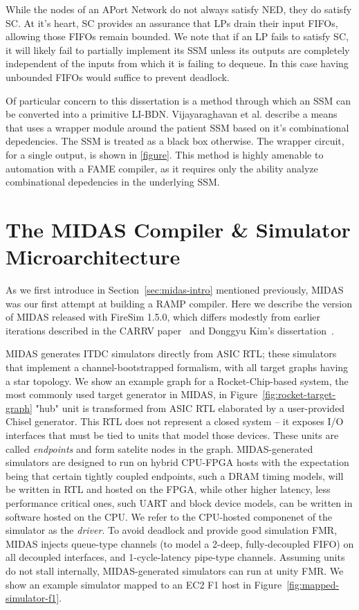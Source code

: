 While the nodes of an APort Network do not always satisfy NED, they do satisfy
SC. At it's heart, SC provides an assurance that LPs drain their input FIFOs,
allowing those FIFOs remain bounded. We note that if an LP fails to satisfy
SC, it will likely fail to partially implement its SSM unless its outputs are
completely independent of the inputs from which it is failing to dequeue. In
this case having unbounded FIFOs would suffice to prevent deadlock.

Of particular concern to this dissertation is a method through which an SSM can
be converted into a primitive LI-BDN.  Vijayaraghavan et al. describe a means that uses
a wrapper module around the patient SSM based on it's combinational
depedencies. The SSM is treated as a black box otherwise. The wrapper circuit,
for a single output, is shown in \ref{figure}. This method is highly amenable
to automation with a FAME compiler, as it requires only the ability analyze
combinational depedencies in the underlying SSM.

\section{The MIDAS Compiler \& Simulator Microarchitecture}

As we first introduce in Section~\ref{sec:midas-intro} mentioned previously,
MIDAS was our first attempt at building a RAMP compiler. Here we describe the
version of MIDAS released with FireSim 1.5.0, which differs modestly from earlier iterations 
described in the CARRV paper~\cite{MIDAS} and Donggyu Kim's dissertation~\cite{DGKDissertation}.

MIDAS generates ITDC simulators directly from ASIC RTL; these simulators that
implement a channel-bootstrapped formalism, with all target graphs having a
star topology. We show an example graph for a Rocket-Chip-based system, the
most commonly used target generator in MIDAS, in Figure~\ref{fig:rocket-target-graph}
"hub" unit is transformed from ASIC RTL elaborated by a user-provided Chisel
generator. This RTL does not represent a
closed system -- it exposes I/O interfaces that must be tied to units that model those
devices. These units are called \emph{endpoints} and form satelite nodes in the graph.
MIDAS-generated simulators are designed to run on hybrid CPU-FPGA hosts
with the expectation being that certain tightly coupled endpoints, such a DRAM
timing models, will be written in RTL and hosted on the FPGA, while other higher
latency, less performance critical ones, such UART and block device models, can
be written in software hosted on the CPU. We refer to the CPU-hosted componenet
of the simulator as the \emph{driver}. To avoid deadlock and provide good
simulation FMR, MIDAS injects queue-type channels (to model a 2-deep,
fully-decoupled FIFO) on all decoupled interfaces, and 1-cycle-latency
pipe-type channels. Assuming units do not stall internally, MIDAS-generated
simulators can run at unity FMR. We show an example simulator mapped to an EC2 F1 host in Figure~\ref{fig:mapped-simulator-f1}.

